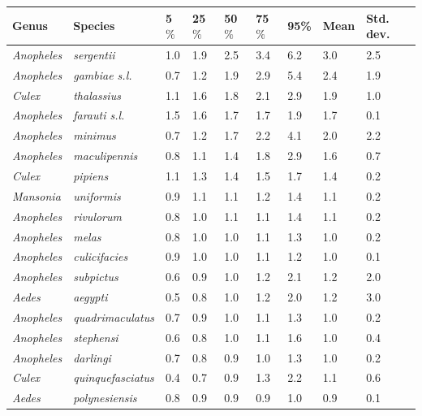 \documentclass[12pt]{article}
\begin{document}
\begin{table}[htbp]
	\begin{tabular}{l|l|l|l|l|l|l|l|l}
		\textbf{Genus} & \textbf{Species} & \textbf{5$\%$} & \textbf{25$\%$} & \textbf{50$\%$} & \textbf{75$\%$} & \textbf{95\%} &  \textbf{Mean} & \textbf{Std. dev.}\\
		\hline
		\textit{Anopheles} & \textit{sergentii} & 1.0 & 1.9 & 2.5 & 3.4 & 6.2 & 3.0 & 2.5 \\
		\textit{Anopheles} & \textit{gambiae s.l.} & 0.7 & 1.2 & 1.9 & 2.9 & 5.4 & 2.4 & 1.9 \\
		\textit{Culex} & \textit{thalassius} & 1.1 & 1.6 & 1.8 & 2.1 & 2.9 & 1.9 & 1.0 \\
		\textit{Anopheles} & \textit{farauti s.l.} & 1.5 & 1.6 & 1.7 & 1.7 & 1.9 & 1.7 & 0.1 \\
		\textit{Anopheles} & \textit{minimus} & 0.7 & 1.2 & 1.7 & 2.2 & 4.1 & 2.0 & 2.2 \\
		\textit{Anopheles} & \textit{maculipennis} & 0.8 & 1.1 & 1.4 & 1.8 & 2.9 & 1.6 & 0.7 \\
		\textit{Culex} & \textit{pipiens} & 1.1 & 1.3 & 1.4 & 1.5 & 1.7 & 1.4 & 0.2 \\
		\textit{Mansonia} & \textit{uniformis} & 0.9 & 1.1 & 1.1 & 1.2 & 1.4 & 1.1 & 0.2 \\
		\textit{Anopheles} & \textit{rivulorum} & 0.8 & 1.0 & 1.1 & 1.1 & 1.4 & 1.1 & 0.2 \\
		\textit{Anopheles} & \textit{melas} & 0.8 & 1.0 & 1.0 & 1.1 & 1.3 & 1.0 & 0.2 \\
		\textit{Anopheles} & \textit{culicifacies} & 0.9 & 1.0 & 1.0 & 1.1 & 1.2 & 1.0 & 0.1 \\
		\textit{Anopheles} & \textit{subpictus} & 0.6 & 0.9 & 1.0 & 1.2 & 2.1 & 1.2 & 2.0 \\
		\textit{Aedes} & \textit{aegypti} & 0.5 & 0.8 & 1.0 & 1.2 & 2.0 & 1.2 & 3.0 \\
		\textit{Anopheles} & \textit{quadrimaculatus} & 0.7 & 0.9 & 1.0 & 1.1 & 1.3 & 1.0 & 0.2 \\
		\textit{Anopheles} & \textit{stephensi} & 0.6 & 0.8 & 1.0 & 1.1 & 1.6 & 1.0 & 0.4 \\
		\textit{Anopheles} & \textit{darlingi} & 0.7 & 0.8 & 0.9 & 1.0 & 1.3 & 1.0 & 0.2 \\
		\textit{Culex} & \textit{quinquefasciatus} & 0.4 & 0.7 & 0.9 & 1.3 & 2.2 & 1.1 & 0.6 \\
		\textit{Aedes} & \textit{polynesiensis} & 0.8 & 0.9 & 0.9 & 0.9 & 1.0 & 0.9 & 0.1 \\

\end{tabular}
\end{table}
\end{document}
